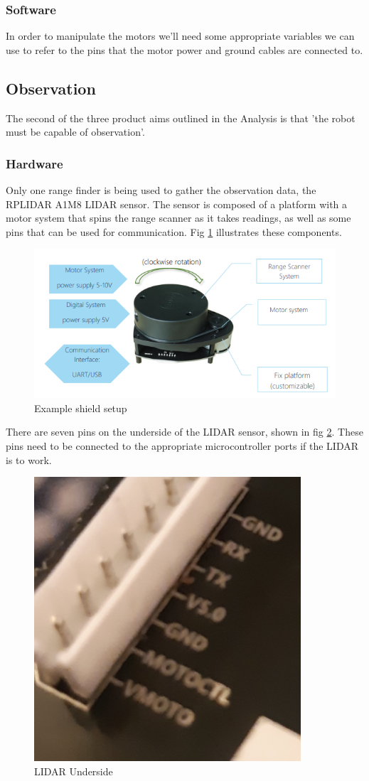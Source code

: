 				\subsubsection{Software}
				In order to manipulate the motors we'll need some appropriate variables we can use to refer to the pins that the motor power and ground cables are connected to. 

				
			\subsection{Observation}
			The second of the three product aims outlined in the Analysis is that 'the robot must be capable of observation'.
				\subsubsection{Hardware}
				Only one range finder is being used to gather the observation data, the RPLIDAR A1M8 LIDAR sensor. The sensor is composed of a platform with a motor system that spins the range scanner as it takes readings, as well as some pins that can be used for communication. Fig \ref{fig:rplidarconfig} illustrates these components.
				
				\begin{figure}[h]
					\centering
					\includegraphics[width=.9\linewidth]{SYNTHESIS/rplidar_configuration.png}
					\caption{Example shield setup}
					\label{fig:rplidarconfig}
				\end{figure}
			
				There are seven pins on the underside of the LIDAR sensor, shown in fig \ref{fig:lidarunderside}. These pins need to be connected to the appropriate microcontroller ports if the LIDAR is to work. 
				\begin{figure}[h]
					\centering
					\includegraphics[width=.4\linewidth]{SYNTHESIS/lidarunderside.png}
					\caption{LIDAR Underside}
					\label{fig:lidarunderside}
				\end{figure}
				
